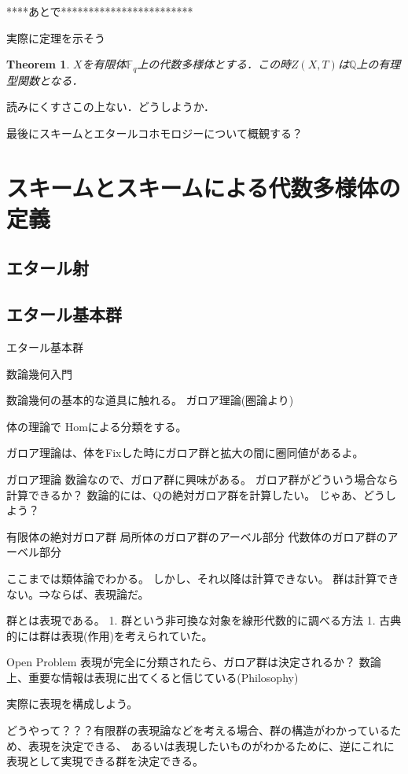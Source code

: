 \documentclass{ujarticle}
\newtheorem{thm}{Theorem}[section]
\begin{document}
****あとで************************

実際に定理を示そう

\begin{thm}
 $X$を有限体$\mathbb{F}_q$上の代数多様体とする．この時$Z(X,T)$は$\mathbb{Q}$上の有理型関数となる．
\end{thm}

読みにくすさこの上ない．どうしようか．


最後にスキームとエタールコホモロジーについて概観する？


\section{スキームとスキームによる代数多様体の定義}
\label{sub:スキームの定義}

\subsection{エタール射}
\label{sub:エタール射}

\subsection{エタール基本群}
\label{sub:エタール基本群}

エタール基本群


数論幾何入門

数論幾何の基本的な道具に触れる。
ガロア理論(圏論より)

体の理論で
Homによる分類をする。

ガロア理論は、体をFixした時にガロア群と拡大の間に圏同値があるよ。

ガロア理論
数論なので、ガロア群に興味がある。
ガロア群がどういう場合なら計算できるか？
数論的には、Qの絶対ガロア群を計算したい。
じゃあ、どうしよう？

有限体の絶対ガロア群
局所体のガロア群のアーベル部分
代数体のガロア群のアーベル部分

ここまでは類体論でわかる。
しかし、それ以降は計算できない。
群は計算できない。⇒ならば、表現論だ。

群とは表現である。
1. 群という非可換な対象を線形代数的に調べる方法
1. 古典的には群は表現(作用)を考えられていた。

Open Problem 表現が完全に分類されたら、ガロア群は決定されるか？
数論上、重要な情報は表現に出てくると信じている(Philosophy)

実際に表現を構成しよう。

どうやって？？？有限群の表現論などを考える場合、群の構造がわかっているため、表現を決定できる、
あるいは表現したいものがわかるために、逆にこれに表現として実現できる群を決定できる。
\end{document}
